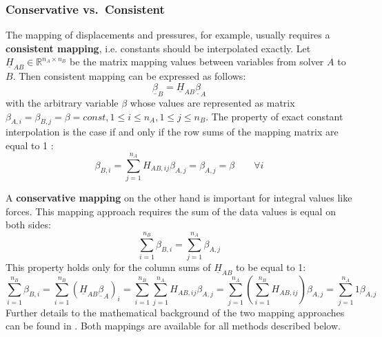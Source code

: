  \subsubsection{Conservative vs.\ Consistent}
   The mapping of displacements and pressures, for example, usually requires a \textbf{consistent mapping}, i.e. constants should be interpolated exactly. Let $\underline{H}_{AB} \in \mathbb{R}^{n_A \times n_B}$ be the matrix mapping values between variables from solver $A$ to $B$. Then consistent mapping can be expressed as follows:
   \begin{equation}
   \underline{\beta}_B = \underline{H}_{AB} \underline{\beta}_A
   \end{equation}
   with the arbitrary variable $\beta$ whose values are represented as matrix $\beta_{A,i} = \beta_{B,j} = \beta = const, 1 \leq i \leq n_A, 1 \leq j \leq n_B$. The property of exact constant interpolation is the case if and only if the row sums of the mapping matrix are equal to 1 \cite{gatzhammer2015efficient}:
   \begin{equation}
   \beta_{B,i} = \sum_{j=1}^{n_A} H_{AB,ij}\beta_{A,j} = \beta_{A,j} = \beta \qquad \forall i
   \end{equation}
   
   A \textbf{conservative mapping} on the other hand is important for integral values like forces. This mapping approach requires the sum of the data values is equal on both sides:
   \begin{equation}
   \sum_{i=1}^{n_B}\beta_{B,i} = \sum_{j=1}^{n_A}\beta_{A,j}
   \end{equation}
   This property holds only for the column sums of $\underline{H}_{AB}$ to be equal to 1:
   \begin{equation}
   \sum_{i=1}^{n_B}\beta_{B,i} = \sum_{i=1}^{n_B}\left( \underline{H}_{AB}\underline{\beta}_A \right)_i = \sum_{i=1}^{n_B}\sum_{j=1}^{n_A} H_{AB,ij}\beta_{A,j} = \sum_{j=1}^{n_A}\left( \sum_{i=1}^{n_B} H_{AB,ij}\right) \beta_{A,j} = \sum_{j=1}^{n_A} 1 \beta_{A,j}
   \end{equation}
   Further details to the mathematical background of the two mapping approaches can be found in \cite{gatzhammer2015efficient}. Both mappings are available for all methods described below.


